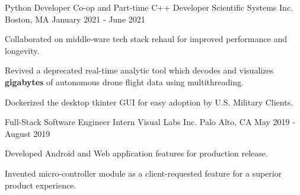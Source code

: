 \begin{cventries}
  \cventry
    {Python Developer Co-op and Part-time C++ Developer} %
    {Scientific Systems Inc.} %
    {Boston, MA} %
    {January 2021 - June 2021} %
    {
      \begin{cvitems} %
        \item {Collaborated on middle-ware tech stack rehaul for improved performance and longevity.}
         \item {Revived a deprecated real-time analytic tool which decodes and visualizes \textbf{gigabytes} of autonomous drone flight data using multithreading.}
        \item {Dockerized the desktop tkinter GUI for easy adoption by U.S. Military Clients.}
      \end{cvitems}
    }
  \cventry
    {Full-Stack Software Engineer Intern} %
    {Visual Labs Inc.} %
    {Palo Alto, CA} %
    {May 2019 - August 2019} %
    {
      \begin{cvitems} %
        \item {Developed Android and Web application features for production release.}
        \item {Invented micro-controller module as a client-requested feature for a superior product experience.}
      \end{cvitems}
    }

\end{cventries}
